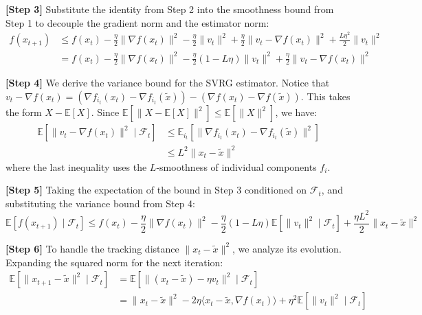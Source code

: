 \documentclass[11pt]{article}
\begin{document}
\textbf{[Step 3]} Substitute the identity from Step 2 into the smoothness bound from Step 1 to decouple the gradient norm and the estimator norm:
\begin{align} 
    f(x_{t+1}) &\le f(x_t) - \frac{\eta}{2} \|\nabla f(x_t)\|^2 - \frac{\eta}{2} \|v_t\|^2 + \frac{\eta}{2} \|v_t - \nabla f(x_t)\|^2 + \frac{L\eta^2}{2} \|v_t\|^2 \nonumber \\
    &= f(x_t) - \frac{\eta}{2} \|\nabla f(x_t)\|^2 - \frac{\eta}{2}(1 - L\eta) \|v_t\|^2 + \frac{\eta}{2} \|v_t - \nabla f(x_t)\|^2 \tag{Step 3}
\end{align}

\textbf{[Step 4]} We derive the variance bound for the SVRG estimator. Notice that $v_t - \nabla f(x_t) = (\nabla f_{i_t}(x_t) - \nabla f_{i_t}(\tilde{x})) - (\nabla f(x_t) - \nabla f(\tilde{x}))$. This takes the form $X - \mathbb{E}[X]$. Since $\mathbb{E}[\|X - \mathbb{E}[X]\|^2] \le \mathbb{E}[\|X\|^2]$, we have:
\begin{align} 
    \mathbb{E}[\|v_t - \nabla f(x_t)\|^2 \mid \mathcal{F}_t] &\le \mathbb{E}_{i_t}[\|\nabla f_{i_t}(x_t) - \nabla f_{i_t}(\tilde{x})\|^2] \nonumber \\
    &\le L^2 \|x_t - \tilde{x}\|^2 \tag{Step 4}
\end{align}
where the last inequality uses the $L$-smoothness of individual components $f_i$.

\textbf{[Step 5]} Taking the expectation of the bound in Step 3 conditioned on $\mathcal{F}_t$, and substituting the variance bound from Step 4:
\begin{equation} \tag{Step 5}
    \mathbb{E}[f(x_{t+1}) \mid \mathcal{F}_t] \le f(x_t) - \frac{\eta}{2} \|\nabla f(x_t)\|^2 - \frac{\eta}{2}(1 - L\eta) \mathbb{E}[\|v_t\|^2 \mid \mathcal{F}_t] + \frac{\eta L^2}{2} \|x_t - \tilde{x}\|^2
\end{equation}

\textbf{[Step 6]} To handle the tracking distance $\|x_t - \tilde{x}\|^2$, we analyze its evolution. Expanding the squared norm for the next iteration:
\begin{align} 
    \mathbb{E}[\|x_{t+1} - \tilde{x}\|^2 \mid \mathcal{F}_t] &= \mathbb{E}[\|(x_t - \tilde{x}) - \eta v_t\|^2 \mid \mathcal{F}_t] \nonumber \\
    &= \|x_t - \tilde{x}\|^2 - 2\eta \langle x_t - \tilde{x}, \nabla f(x_t) \rangle + \eta^2 \mathbb{E}[\|v_t\|^2 \mid \mathcal{F}_t] \tag{Step 6}
\end{align}
\end{document}
